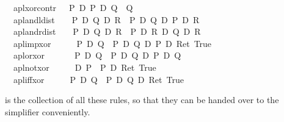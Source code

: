 \begin{isabellebody}
\ \ apl{\isacharunderscore}xor{\isacharunderscore}contr{}{\isacharcolon}\ \ \ {\isachardoublequote}{\isacharparenleft}P\ {\isasymoplus}\isactrlsub D\ {\isacharparenleft}P\ {\isasymoplus}\isactrlsub D\ Q{\isacharparenright}{\isacharparenright}\ {\isacharequal}\ Q{\isachardoublequote}\isanewline
\ \ apl{\isacharunderscore}and{\isacharunderscore}ldist{\isacharcolon}\ \ \ \ {\isachardoublequote}{\isacharparenleft}P\ {\isasymand}\isactrlsub D\ {\isacharparenleft}Q\ {\isasymoplus}\isactrlsub D\ R{\isacharparenright}{\isacharparenright}\ {\isacharequal}\ {\isacharparenleft}{\isacharparenleft}P\ {\isasymand}\isactrlsub D\ Q{\isacharparenright}\ {\isasymoplus}\isactrlsub D\ {\isacharparenleft}P\ {\isasymand}\isactrlsub D\ R{\isacharparenright}{\isacharparenright}{\isachardoublequote}\isanewline
\ \ apl{\isacharunderscore}and{\isacharunderscore}rdist{\isacharcolon}\ \ \ \ {\isachardoublequote}{\isacharparenleft}{\isacharparenleft}P\ {\isasymoplus}\isactrlsub D\ Q{\isacharparenright}\ {\isasymand}\isactrlsub D\ R{\isacharparenright}\ {\isacharequal}\ {\isacharparenleft}{\isacharparenleft}P\ {\isasymand}\isactrlsub D\ R{\isacharparenright}\ {\isasymoplus}\isactrlsub D\ {\isacharparenleft}Q\ {\isasymand}\isactrlsub D\ R{\isacharparenright}{\isacharparenright}{\isachardoublequote}\isanewline
\ \ %
\isanewline
\ \ apl{\isacharunderscore}imp{\isacharunderscore}xor{\isacharcolon}\ \ \ \ \ \ {\isachardoublequote}{\isacharparenleft}P\ {\isasymlongrightarrow}\isactrlsub D\ Q{\isacharparenright}\ {\isacharequal}\ {\isacharparenleft}{\isacharparenleft}P\ {\isasymand}\isactrlsub D\ Q{\isacharparenright}\ {\isasymoplus}\isactrlsub D\ P\ {\isasymoplus}\isactrlsub D\ Ret\ True{\isacharparenright}{\isachardoublequote}\isanewline
\ \ apl{\isacharunderscore}or{\isacharunderscore}xor{\isacharcolon}\ \ \ \ \ \ \ {\isachardoublequote}{\isacharparenleft}P\ {\isasymor}\isactrlsub D\ Q{\isacharparenright}\ {\isacharequal}\ {\isacharparenleft}P\ {\isasymoplus}\isactrlsub D\ Q\ {\isasymoplus}\isactrlsub D\ {\isacharparenleft}P\ {\isasymand}\isactrlsub D\ Q{\isacharparenright}{\isacharparenright}{\isachardoublequote}\isanewline
\ \ apl{\isacharunderscore}not{\isacharunderscore}xor{\isacharcolon}\ \ \ \ \ \ {\isachardoublequote}{\isacharparenleft}{\isasymnot}\isactrlsub D\ P{\isacharparenright}\ {\isacharequal}\ {\isacharparenleft}P\ {\isasymoplus}\isactrlsub D\ Ret\ True{\isacharparenright}{\isachardoublequote}\isanewline
\ \ apl{\isacharunderscore}iff{\isacharunderscore}xor{\isacharcolon}\ \ \ \ \ \ {\isachardoublequote}{\isacharparenleft}P\ {\isasymlongleftrightarrow}\isactrlsub D\ Q{\isacharparenright}\ {\isacharequal}\ {\isacharparenleft}P\ {\isasymoplus}\isactrlsub D\ Q\ {\isasymoplus}\isactrlsub D\ Ret\ True{\isacharparenright}{\isachardoublequote}\isamarkupfalse%
%
\begin{isamarkuptext}%
 is the collection of all these rules, so that
  they can be handed over to the simplifier conveniently.
  

\end{isamarkuptext}
\end{isabellebody}
